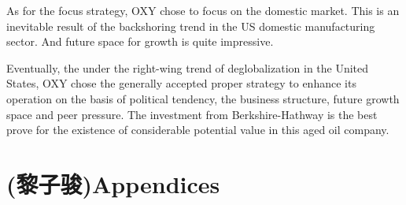 \documentclass[
	a4paper, %
	12pt,%
]{CSSullivanBusinessReport}
\begin{document}
\begin{fullwidth}
\begin{enumerate}
    \par
    As for the focus strategy, OXY chose to focus on the domestic market. This is an inevitable result of the backshoring trend in the US domestic manufacturing sector. And future space for growth is quite impressive.
\end{enumerate}
Eventually, the under the right-wing trend of deglobalization in the United States, OXY chose the generally accepted proper strategy to enhance its operation on the basis of political tendency, the business structure, future growth space and peer pressure. The investment from Berkshire-Hathway is the best prove for the existence of considerable potential value in this aged oil company. 
\par


\newpage


\printbibliography[title=Reference] %


\newpage

\section*{(黎子骏)Appendices}


\end{fullwidth}
\end{document}
